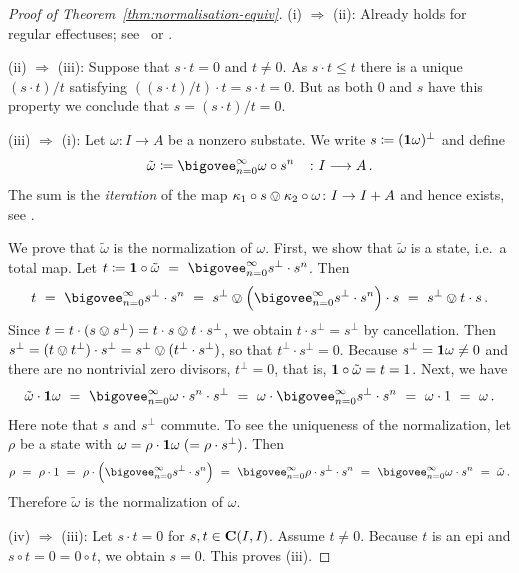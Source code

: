 \documentclass[%
	submission,
copyright,creativecommons,UKenglish]{eptcs}
\begin{document}
\begin{proof}[Proof of Theorem~\ref{thm:normalisation-equiv}]
(i) $\Longrightarrow$ (ii):
Already holds for regular effectuses; see~\cite[Proposition~6.4]{Cho2015}
or \cite[Proposition~4.5.2]{Cho2019PhD}.

(ii) $\Longrightarrow$ (iii):
Suppose that $s\cdot t=0$ and $t\neq 0$.
As $s\cdot t \leq t$ there is a unique $(s\cdot t)/t$ 
satisfying $((s\cdot t)/t) \cdot t = s\cdot t = 0$.
But as both $0$ and $s$ have this property we conclude
that $s=(s\cdot t)/t = 0$.

(iii) $\Longrightarrow$ (i):
Let $\omega\colon I\to A$
be a nonzero substate.
We write $s\coloneqq (\mathbf{1}\omega)^{\bot}$
and define
\[
\tilde{\omega}
\coloneqq\bigovee_{n=0}^{\infty}
\omega\circ s^n
\quad
\colon I\longrightarrow A
\mpunct.
\]
The sum is the \emph{iteration}
of the map $\kappa_1\circ s \ovee
\kappa_2\circ \omega\colon I\to I+A$
and hence exists, see \cite[Theorem~3.2.24]{ManesA1986}.

We prove that $\tilde\omega$ is the normalization of $\omega$.
First, we show that
$\tilde{\omega}$ is a state, i.e.\ a total map.
Let
$t\coloneqq\truth\circ \tilde{\omega}
\ =\  \bigovee_{n=0}^{\infty} s^{\bot}\cdot s^n$.
Then
\[
t\ =\ \bigovee_{n=0}^{\infty} s^{\bot}\cdot s^n
\ =\ s^{\bot}\ovee \qty\Big(\bigovee_{n=0}^{\infty} s^{\bot}\cdot s^n)\cdot s
\ =\ s^{\bot}\ovee t\cdot s
\mpunct.
\]
Since
$t=t\cdot (s\ovee s^{\bot})=t\cdot s\ovee t\cdot s^{\bot}$,
we obtain
$t\cdot s^{\bot}=s^{\bot}$
by cancellation.
Then $s^{\bot}=(t\ovee t^{\bot})\cdot s^{\bot}
=s^{\bot}\ovee (t^{\bot}\cdot s^{\bot})$,
so that $t^{\bot}\cdot s^{\bot}=0$.
Because $s^{\bot}=\mathbf{1}\omega\neq 0$
and there are no nontrivial zero divisors,
$t^{\bot}=0$, that is,
$\mathbf{1}\circ \tilde{\omega}=t=1$.
Next, we have
\[
\tilde{\omega}\cdot \truth\omega
\ =\ 
\bigovee_{n=0}^{\infty}\omega\cdot s^n\cdot s^{\bot}
\ =\ 
\omega\cdot
\bigovee_{n=0}^{\infty}s^{\bot}\cdot s^n
\ =\ 
\omega\cdot
1
\ =\ \omega
\mpunct.
\]
Here note that $s$ and $s^{\bot}$ commute.
To see the uniqueness of the normalization,
let $\rho$ be a state with $\omega=\rho\cdot \mathbf{1}\omega
\;(=\rho\cdot s^{\bot})$.
Then
\[
\rho
\ =\ \rho\cdot 1
\ =\ \rho\cdot \paren[\Big]{\bigovee_{n=0}^{\infty} s^{\bot}\cdot s^n}
\ =\ \bigovee_{n=0}^{\infty} \rho\cdot s^{\bot}\cdot s^n
\ =\ \bigovee_{n=0}^{\infty} \omega\cdot s^n
\ =\ \tilde{\omega}
\mpunct.
\]
Therefore $\tilde{\omega}$ is the normalization
of $\omega$.

(iv) $\Longrightarrow$ (iii):
Let $s\cdot t=0$ for $s,t\in\mathbf{C}(I,I)$.
Assume $t\neq 0$.
Because $t$ is an epi and
$s\circ t=0=0\circ t$,
we obtain $s=0$. This proves (iii).


\end{proof}
\end{document}
